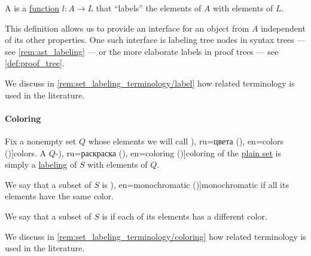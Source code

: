 \begin{definition}\label{def:labeled_set}\mimprovised
  A  is a \hyperref[def:function]{function} \( l: A \to L \) that \enquote{labels} the elements of \( A \) with elements of \( L \).
\end{definition}
\begin{comments}
  \item This definition allows us to provide an interface for an object from \( A \) independent of its other properties. One such interface is labeling tree nodes in syntax trees --- see \cref{rem:ast_labeling} --- or the more elaborate labels in proof trees --- see \cref{def:proof_tree}.

  We discuss in \cref{rem:set_labeling_terminology/label} how related terminology is used in the literature.
\end{comments}

\paragraph{Coloring}

\begin{definition}\label{def:set_coloring}\mimprovised
  Fix a nonempty set \( Q \) whose elements we will call \term[bg=цветове (\cite[141]{Мирчев2001Графи}), ru=цвета (\cite[\S 10.7.1]{Новиков2013ДискретнаяМатематика}), en=colors (\cite[395]{Erickson2019Algorithms})]{colors}. A \( Q \)-\term[bg=оцветяване (\cite[141]{Мирчев2001Графи}), ru=раскраска (\cite[\S 10.7.1]{Новиков2013ДискретнаяМатематика}), en=coloring (\cite[124]{Aigner1997CombinatorialTheory})]{coloring} of the \hyperref[def:set]{plain set} is simply a \hyperref[def:labeled_set]{labeling} of \( S \) with elements of \( Q \).

  \begin{thmenum}
     We say that a subset of \( S \) is \term[ru=одноцветный (класс) (\cite[\S 10.7.1]{Новиков2013ДискретнаяМатематика}), en=monochromatic (\cite[567]{GowersEtAl2008PrincetonCompanion})]{monochromatic} if all its elements have the same color.

     We say that a subset of \( S \) is  if each of its elements has a different color.
  \end{thmenum}
\end{definition}
\begin{comments}
  \item We discuss in \cref{rem:set_labeling_terminology/coloring} how related terminology is used in the literature.
\end{comments}

